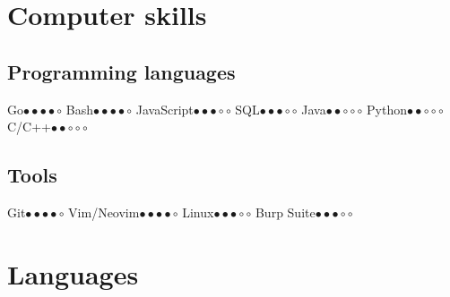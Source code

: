 \section{Computer skills}

\subsection{Programming languages}
\cvcomputer
{Go}{\( \bullet \bullet \bullet \bullet \circ \)}
{Bash}{\( \bullet \bullet \bullet \bullet \circ \)}
\cvcomputer
{JavaScript}{\( \bullet \bullet \bullet \circ \circ \)}
{SQL}{\( \bullet \bullet \bullet \circ \circ \)}
\cvcomputer
{Java}{\( \bullet \bullet \circ \circ \circ \)}
{Python}{\( \bullet \bullet \circ \circ \circ \)}
\cvcomputer
{C/C++}{\( \bullet \bullet \circ \circ \circ \)}
{}{}

\subsection{Tools}
\cvcomputer
{Git}{\( \bullet \bullet \bullet \bullet \circ \)}
{Vim/Neovim}{\( \bullet \bullet \bullet \bullet \circ \)}
\cvcomputer
{Linux}{\( \bullet \bullet \bullet \circ \circ \)}
{Burp Suite}{\( \bullet \bullet \bullet \circ \circ \)}

\section{Languages}


